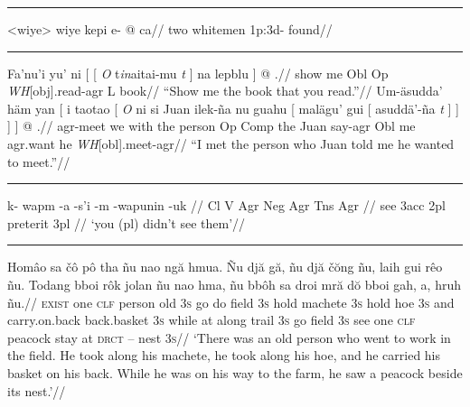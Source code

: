 \documentclass[12pt]{article}
\begin{document}
\filbreak\hrule\medskip

\begingroup
\ex<wiye>
\begingl
\gla wiye kepi e- @ ca//
\glb two whitemen {\sc 1p:3d}- found//
\endgl
\xe
\endgroup
\bigskip

\filbreak\hrule\medskip

\begingroup
{}
\a
\begingl
\gla Fa'nu'i yu' ni [ [ {\it O} t{\it in\/}aitai-mu {\it t\/} ] na
lepblu ] @ .//
\glb show me Obl Op {\it WH\/}[obj].read-agr {} L book//
\glft ``Show me the book that you read.''//
\endgl
\a \begingl
\gla Um-\"asudda' h\"am yan [ i taotao [ {\it O\/} ni si Juan
ilek-\~na nu guahu [ mal\"agu' gui [ asudd\"a'-\~na {\it
t\/} ] ] ] ] @ .//
\glb agr-meet we with the person Op Comp the Juan say-agr Obl me
agr.want he {\it WH\/}[obl].meet-agr//
\glft ``I met the person who Juan told me he wanted to meet.''//
\endgl
\xe
\endgroup
\bigskip

\filbreak\hrule\medskip

\begingroup
{}

\ex
\begingl
\gla k- wapm -a -s'i -m -wapunin -uk //
\glcat Cl V Agr Neg Agr Tns Agr //
 see {3\sc acc} {} {2\sc pl} preterit {3\sc pl} //
\glft `you (pl) didn't see them'//
\endgl
\xe
\endgroup
\bigskip

\filbreak\hrule\medskip

\begingroup
\ex[glftpos=right,glhangstyle=none]
\let\\=\textsc
\begingl
\gla
Hom\^{a}o sa \v{c}\^{o} p\^{o} tha  \~{n}u nao ng\u{a} hmua. \~{N}u
dj\u{a} g\u{a}, \~{n}u dj\u{a} \v{c}\u{o}ng \~{n}u, laih gui r\^{e}o
\~{n}u. Todang bboi r\^{o}k jolan \~{n}u nao hma, \~{n}u bb\^{o}h sa
droi mr\u{a} d\u{o} bboi gah, a, hruh \~{n}u.//
\glb
\\{exist} one \\{clf} person old \\{3s} go do field \\{3s} hold
machete \\{3s} hold hoe \\{3s} and carry.on.back back.basket \\{3s}
while at along trail \\{3s} go field \\{3s} see one \\{clf} peacock
stay at \\{drct} -- nest \\{3s}//
\glft
`There was an old person who went to work in the field. He took
along his machete, he took along his hoe, and he carried his
basket on his back. While he was on his way to the farm, he saw a
peacock beside its nest.'//
\endgl
\xe
\endgroup
\bigskip
\end{document}
